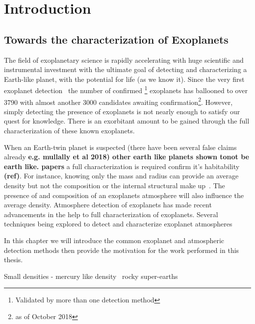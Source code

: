 \chapter{Introduction}  %
\label{cha:introduction}

\section{Towards the characterization of Exoplanets}

The field of exoplanetary science is rapidly accelerating with huge scientific and instrumental investment with the ultimate goal of detecting and characterizing a Earth-like planet, with the potential for life (as we know it). Since the very first exoplanet detection~\citet{ mayor_jupitermass_1995} the number of confirmed \footnote{Validated by more than one detection method} exoplanets has ballooned to over 3790 with almost another 3000 candidates awaiting confirmation\footnote{as of October 2018}. However, simply detecting the presence of exoplanets is not nearly enough to satisfy our quest for knowledge. There is an exorbitant amount to be gained through the full characterization of these known exoplanets.

When an Earth-twin planet is suspected (there have been several false claims already \textbf{e.g. mullally et al 2018)\citet{mullally_keplers_2018} other earth like planets shown tonot be earth like. papers} a full characterization is required confirm it's habitability \textbf{(ref)}. For instance, knowing only the mass and radius can provide an average density but not the composition or the internal structural make up~\citet{a paper about composition degeneracy}. The presence of and composition of an exoplanets atmosphere will also influence the average density. Atmosphere detection of exoplanets has made recent advancements in the help to full characterization of exoplanets. Several techniques being explored to detect and characterize exoplanet atmospheres~\citep[e.g.]{martins_reflected_2015, transmission spectroscopy,  pikorz 201  ,snellen?}

In this chapter we will introduce the common exoplanet and atmospheric detection methods then provide the motivation for the work performed in this thesis.



Small densities - mercury like  density~\citet{dittmann_temperate_2017, santerne_earthsized_2018, ment_second_2018} rocky super-earths


